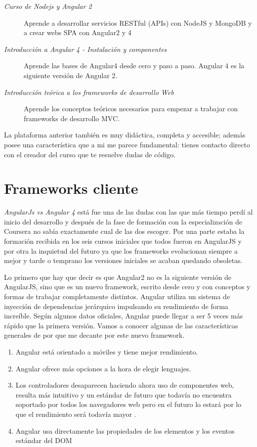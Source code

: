 \begin{description}
	\item[\emph{Curso de Nodejs y Angular 2}] Aprende a desarrollar servicios RESTful (APIs) con NodeJS y MongoDB y a crear webs SPA con Angular2 y 4
	\item[ \emph{Introducción a Angular 4 - Instalación y componentes}] Aprende las bases de Angular4 desde cero y paso a paso. Angular 4 es la siguiente versión de Angular 2.
	\item[ \emph{Introducción teórica a los frameworks de desarrollo Web}] Aprende los conceptos teóricos necesarios para empezar a trabajar con frameworks de desarrollo MVC.
\end{description}


La plataforma anterior también es muy didáctica, completa y accesible; además posee una característica que a mi me parece fundamental: tienes contacto directo con el creador del curso que te resuelve dudas de código. 


 \section{Frameworks cliente}\label{cliente}
 
 \emph{AngularJs vs Angular 4} está fue una de las dudas con las que más tiempo perdí al inicio del desarrollo y después de la fase de formación con la especialización de Coursera no sabía exactamente cual de las dos escoger. Por una parte estaba la formación recibida en los seis cursos iniciales que todos fueron en AngularJS y por otra la inquietud del futuro ya que los frameworks evolucionan siempre a mejor y tarde o temprano los versiones iniciales se acaban quedando obsoletas. 
 
 Lo primero que hay que decir es que Angular2 no es la siguiente versión de AngularJS, sino que es un nuevo framework, escrito desde cero y con conceptos y formas de trabajar completamente distintos. Angular utiliza un sistema de inyección de dependencias jerárquico impulsando su rendimiento de forma increíble.  Según algunos datos oficiales, Angular puede llegar a ser 5 veces más rápido que la primera versión.  Vamos a conocer algunas de las características generales de por que me decante por este nuevo framework. 
 
 \begin{enumerate}
	\item Angular está orientado a móviles y tiene mejor rendimiento.
	\item Angular ofrece más opciones a la hora de elegir lenguajes.
	\item Los controladores desaparecen haciendo ahora uso de componentes web, resulta más intuitivo y un estándar de futuro que todavía no encuentra soportado por todos los navegadores web pero en el futuro lo estará por lo que el rendimiento será todavía mayor .
	\item Angular usa directamente las propiedades de los elementos y los eventos estándar del DOM
\end{enumerate}
 
